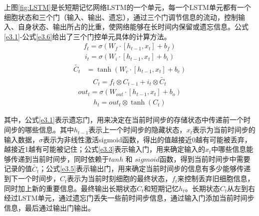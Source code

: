 上图\ref{fig:LSTM}是长短期记忆网络LSTM的一个单元，每一个LSTM单元都有一个细胞状态和三个门（输入、输出、遗忘），通过三个门调节信息的流动，控制输入、自身状态、输出所占的比重，使网络能够在长时间内保留或遗忘信息。公式\ref{e3.1}-公式\ref{e3.6}给出了三个门控单元具体的计算方法。
\begin{equation}\label{e3.1}
  \begin{split}
    f_{t} = \sigma \left(W_{f} \cdot \left[h_{t-1},x_{t}\right] + b_f \right)
  \end{split}
\end{equation}
\begin{equation}\label{e3.2}
  \begin{split}
    i_t = \sigma \left(W_{i} \cdot \left[h_{t-1},x_{t}\right] + b_i\right)
  \end{split}
\end{equation}
\begin{equation}\label{e3.3}
  \begin{split}
    \widetilde{C_t} &= \tanh \left(W_{c} \cdot \left[h_{t-1},x_{t}\right] + b_c \right)
  \end{split}
\end{equation}
\begin{equation}\label{e3.4}
  \begin{split}
    C_t = f_t \otimes C_{t-1} + i_t \otimes \widetilde{C_t}
  \end{split}
\end{equation}
\begin{equation}\label{e3.5}
  \begin{split}
   out_t = \sigma \left(W_{out} \cdot \left[h_{t-1},x_{t}\right] + b_o \right)
  \end{split}
\end{equation}
\begin{equation}\label{e3.6}
  \begin{split}
   h_t = out_t \otimes \tanh \left(C_t\right)
  \end{split}
\end{equation}

其中，公式\ref{e3.1}表示遗忘门，用来决定在当前时间步的存储状态中传递前一个时间步的哪些信息。其中$h_{t-1}$表示上一个时间步的隐藏状态，$x_{t}$表示为当前时间步的输入数据，$\sigma$表示为非线性激活sigmoid函数，得出的值越接近0越有可能被丢弃，越接近1越有可能被记住；公式\ref{e3.3}表示输入门，用来确定输入的$x_{t}$中哪些信息能够传递到当前时间步，同时依赖于$tanh$ 和 $sigmoid$函数，得到当前时间步中需要记录的值$\widetilde{C_t}$；公式\ref{e3.5}表示输出门，用来确定当前时间步的信息有多少能够传递到下一个时间步，$C_t$表示为当前时刻细胞的最终状态，$f_{t}$来控制丢弃旧细胞信息，同时加上新的重要信息。最终输出长期状态$C_t$和短期记忆$h_t$。长期状态$C_t$从左到右经过LSTM单元，通过遗忘门丢失一些前时间步信息，通过输入门添加当前时间步信息，最后通过输出门输出。

